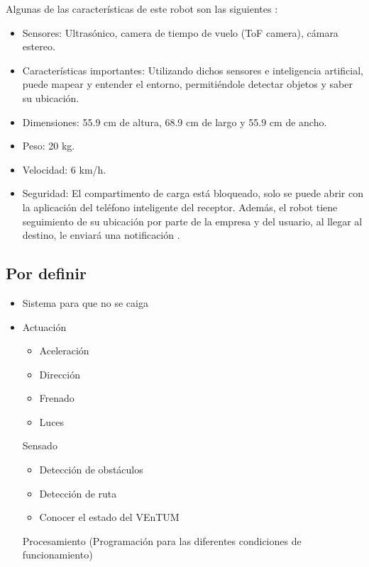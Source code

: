 Algunas de las características de este robot son las siguientes \cite{starship_feature}:

\begin{itemize}
\item Sensores: Ultrasónico, camera de tiempo de vuelo (ToF camera), cámara estereo.

\item Características importantes: Utilizando dichos sensores e inteligencia artificial, puede mapear y entender el entorno, permitiéndole detectar objetos y saber su ubicación.

\item Dimensiones: 55.9 cm de altura, 68.9 cm de largo y 55.9 cm de ancho.

\item Peso: 20 kg.

\item Velocidad: 6 km/h.

\item Seguridad: El compartimento de carga está bloqueado, solo se puede abrir con la aplicación del teléfono inteligente del receptor. Además, el robot tiene seguimiento de su ubicación por parte de la empresa y del usuario, al llegar al destino, le enviará una notificación \cite{starship}.
\end{itemize}







\subsection{Por definir}
\begin{itemize}
\item Sistema para que no se caiga
\item Actuación

\begin{itemize}
\item Aceleración
\item Dirección
\item Frenado
\item Luces
\end{itemize}

Sensado
\begin{itemize}
\item Detección de obstáculos
\item Detección de ruta
\item Conocer el estado del VEnTUM
\end{itemize}

Procesamiento (Programación para las diferentes condiciones de funcionamiento)

\end{itemize}




